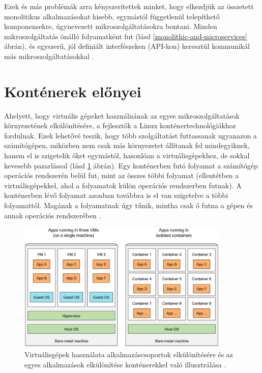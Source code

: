 Ezek és más problémák arra kényszerítettek minket, hogy elkezdjük az összetett monolitikus alkalmazásokat kisebb, egymástól függetlenül telepíthető komponensekre, úgynevezett mikroszolgáltatásokra bontani.
Minden mikroszolgáltatás önálló folyamatként fut (lásd \ref{monolithic-and-microservices} ábrán), és egyszerű, jól definiált interfészeken (API-kon) keresztül kommunikál más mikroszolgáltatásokkal \cite{Marko17}.

\section{Konténerek előnyei}
Ahelyett, hogy virtuális gépeket használnának az egyes mikroszolgáltatások környezetének elkülönítésére, a fejlesztők a Linux konténertechnológiákhoz fordulnak.
Ezek lehetővé teszik, hogy több szolgáltatást futtassanak ugyanazon a számítógépen, miközben nem csak más környezetet állítanak fel mindegyiknek, hanem el is szigetelik őket egymástól, hasonlóan a virtuálisgépekhez, de sokkal kevesebb pazarlással (lásd \ref{vm-vs-containers} ábrán).
Egy konténerben futó folyamat a számítógép operációs rendszerén belül fut, mint az összes többi folyamat (ellentétben a virtuálisgépekkel, ahol a folyamatok külön operációs rendszerben futnak).
A konténerben lévő folyamat azonban továbbra is el van szigetelve a többi folyamattól.
Magának a folyamatnak úgy tűnik, mintha csak ő futna a gépen és annak operációs rendszerében \cite{Marko17}.

\begin{figure}[ht]
    \centering
         \includegraphics[width=0.9\textwidth]{figures/docker/vm-vs-containers.png}
          \caption{Virtuálisgépek használata alkalmazáscsoportok elkülönítésére és az egyes alkalmazások elkülönítése konténerekkel való illusztrálása \cite{Marko17}.}
           \label{vm-vs-containers}
\end{figure}

